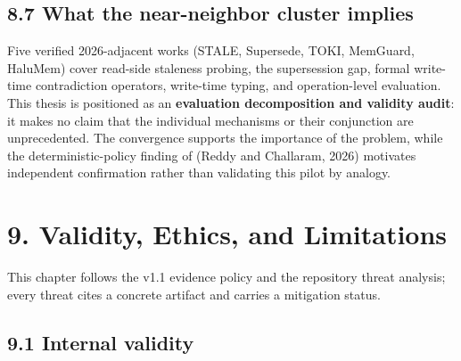 \subsection{8.7 What the near-neighbor cluster
implies}\label{what-the-near-neighbor-cluster-implies}

Five verified 2026-adjacent works (STALE, Supersede, TOKI, MemGuard,
HaluMem) cover read-side staleness probing, the supersession gap, formal
write-time contradiction operators, write-time typing, and
operation-level evaluation. This thesis is positioned as an
\textbf{evaluation decomposition and validity audit}: it makes no claim
that the individual mechanisms or their conjunction are unprecedented.
The convergence supports the importance of the problem, while the
deterministic-policy finding of (Reddy and Challaram, 2026) motivates
independent confirmation rather than validating this pilot by analogy.

\section{9. Validity, Ethics, and
Limitations}\label{validity-ethics-and-limitations}

This chapter follows the v1.1 evidence policy and the repository threat
analysis; every threat cites a concrete artifact and carries a
mitigation status.

\subsection{9.1 Internal validity}\label{internal-validity}

